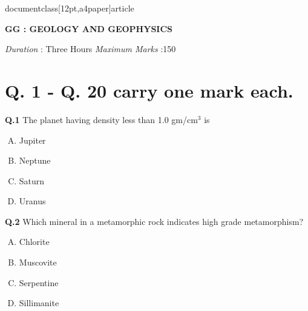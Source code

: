 documentclass[12pt,a4paper]{article}
\usepackage[margin=1in]{geometry}
\usepackage{amsmath}
\usepackage{amssymb}
\usepackage{graphicx}
\usepackage{tikz}
\usepackage{array}
\usepackage{multirow}
\usepackage{fancyhdr}
\usepackage{enumerate}
\usepackage{caption}
\usepackage{multicol}



\pagestyle{fancy}
\fancyhf{}



\begin{center}
{\Large \textbf{GG : GEOLOGY AND GEOPHYSICS}}
\end{center}

\vspace{0.5cm}

\noindent \textit{Duration} : Three Hours \hfill \textit{Maximum Marks} :150

\vspace{0.5cm}



\section*{Q. 1 - Q. 20 carry one mark each.}

    


\textbf{Q.1} The planet having density less than 1.0 gm/cm$^3$ is
\begin{multicols}{4}
\begin{enumerate}[(A)]

\item Jupiter \item  Neptune \item Saturn \item  Uranus
\end{enumerate}
\end{multicols}



\textbf{Q.2} Which mineral in a metamorphic rock indicates high grade metamorphism?
\begin{multicols}{4}
\begin{enumerate}[(A)]
\item Chlorite \item  Muscovite \item   Serpentine \item Sillimanite
\end{enumerate}
\end{multicols}

